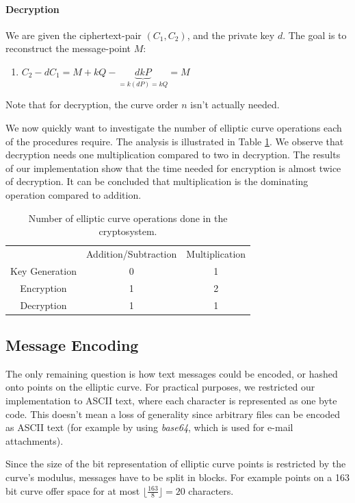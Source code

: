\documentclass[11pt,english]{article}
\begin{document}
\paragraph{Decryption}
We are given the ciphertext-pair $(C_1,C_2)$, and the private key $d$. The goal is to reconstruct the message-point $M$:
\begin{enumerate}
\item $C_2-dC_1=M+kQ-\underbrace{dkP}_{=k(dP)=kQ}=M$
\end{enumerate}
Note that for decryption, the curve order $n$ isn't actually needed. 

We now quickly want to investigate the number of elliptic curve operations each of the procedures require. The analysis is illustrated in Table \ref{elgoperations}.
We observe that decryption needs one multiplication compared to two in decryption. The results of our implementation show that the time needed for encryption is almost twice of decryption. It can be concluded that multiplication is the dominating operation compared to addition.

\begin{table}
\centering
\begin{tabular}{c|c|c}
 & Addition/Subtraction & Multiplication \\ \cline{1-3}
Key Generation & 0 & 1 \\ 
Encryption & 1 & 2 \\ 
Decryption & 1 & 1
\end{tabular}
\caption{Number of elliptic curve operations done in the cryptosystem.}
\label{elgoperations}
\end{table}


\subsection{Message Encoding}
\label{Message Encoding}
The only remaining question is how text messages could be encoded, or hashed onto points on the elliptic curve. For practical purposes, we restricted our implementation to ASCII text, where each character is represented as one byte code. This doesn't mean a loss of generality since arbitrary files can be encoded as ASCII text (for example by using \emph{base64}, which is used for e-mail attachments).

Since the size of the bit representation of elliptic curve points is restricted by the curve's modulus, messages have to be split in blocks. For example points on a 163 bit curve offer space for at most $\lfloor\frac{163}{8}\rfloor=20$ characters.
\end{document}
